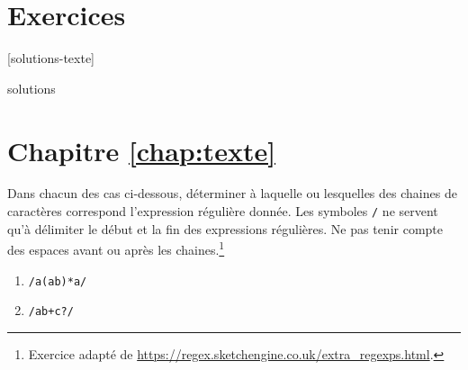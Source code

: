 \section{Exercices}
\label{sec:texte:exercices}

[solutions-texte]

\begin{Filesave}{solutions}
\section*{Chapitre \ref*{chap:texte}}

\end{Filesave}


\begin{exercice}
  Dans chacun des cas ci-dessous, déterminer à laquelle ou lesquelles
  des chaines de caractères correspond l'expression régulière donnée.
  Les symboles \verb=/= ne servent qu'à délimiter le début et la fin
  des expressions régulières. Ne pas tenir compte des espaces avant ou
  après les chaines.\footnote{%
    Exercice adapté de
    \url{https://regex.sketchengine.co.uk/extra_regexps.html}.}
  \begin{enumerate}
    \setlength{\multicolsep}{2pt}
  \item \verb~/a(ab)*a/~
    \begin{enumerate}[1)]
    \end{enumerate}
  \item \verb~/ab+c?/~
    \begin{enumerate}[1)]
      \begin{multicols}{3}

\end{multicols}
\end{enumerate}
\end{enumerate}
\end{exercice}

